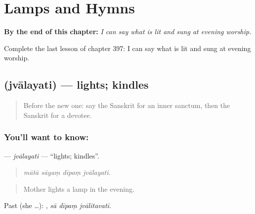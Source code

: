 
\chapter{Lamps and Hymns}
\label{ch:sa-lamps-and-hymns}

\begin{chapteropening}
\textbf{By the end of this chapter:} \emph{I can say what is lit and sung at evening worship.}

Complete the last lesson of chapter 397: I can say what is lit and sung at evening worship.
\end{chapteropening}

\section[\texorpdfstring{\sk{ज्वालयति} (jvālayati)}{ज्वालयति (jvālayati)}]{ (jvālayati) — lights; kindles}

\label{lesson:SA-C397-jvalayati}



\begin{quote}
Before the new one: say the Sanskrit for an inner sanctum, then the Sanskrit for a devotee.
\end{quote}

\subsection*{You'll want to know: }
\textbf{} — \emph{jvālayati} — \textquotedblleft{}lights; kindles\textquotedblright{}.

\begin{quote}
   
\end{quote}

\begin{quote}
\emph{mātā sāyaṃ dīpaṃ jvālayati.}
\end{quote}

\begin{quote}
Mother lights a lamp in the evening.
\end{quote}

Past (she …):   , \emph{sā dīpaṃ jvālitavatī}.

